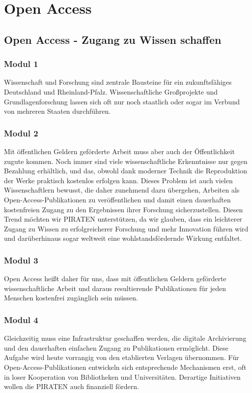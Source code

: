 \section{Open Access}

\subsection*{Open Access - Zugang zu Wissen schaffen}
\label{wp:oa:zugang}

\subsubsection{Modul 1}
\abstimmung 	Wissenschaft und Forschung sind zentrale Bausteine für ein zukunftsfähiges Deutschland und Rheinland-Pfalz. Wissenschaftliche Großprojekte und Grundlagenforschung lassen sich oft nur noch staatlich oder sogar im Verbund von mehreren Staaten durchführen.

\subsubsection{Modul 2}
\abstimmung
Mit öffentlichen Geldern geförderte Arbeit muss aber auch der Öffentlichkeit zugute kommen. Noch immer sind viele wissenschaftliche Erkenntnisse nur gegen Bezahlung erhältlich, und das, obwohl dank moderner Technik die Reproduktion der Werke praktisch kostenlos erfolgen kann. Dieses Problem ist auch vielen Wissenschaftlern bewusst, die daher zunehmend dazu übergehen, Arbeiten als Open-Access-Publikationen zu veröffentlichen und damit einen dauerhaften kostenfreien Zugang zu den Ergebnissen ihrer Forschung sicherzustellen. Diesen Trend möchten wir PIRATEN unterstützen, da wir glauben, dass ein leichterer Zugang zu Wissen zu erfolgreicherer Forschung und mehr Innovation führen wird und darüberhinaus sogar weltweit eine wohlstandsfördernde Wirkung entfaltet.

\subsubsection{Modul 3}
\abstimmung
Open Access heißt daher für uns, dass mit öffentlichen Geldern geförderte wissenschaftliche Arbeit und daraus resultierende Publikationen für jeden Menschen kostenfrei zugänglich sein müssen.

\subsubsection{Modul 4}
\abstimmung
Gleichzeitig muss eine Infrastruktur geschaffen werden, die digitale Archivierung und den dauerhaften einfachen Zugang zu Publikationen ermöglicht. Diese Aufgabe wird heute vorrangig von den etablierten Verlagen übernommen. Für Open-Access-Publikationen entwickeln sich entsprechende Mechanismen erst, oft in loser Kooperation von Bibliotheken und Universitäten. Derartige Initiativen wollen die PIRATEN auch finanziell fördern.

